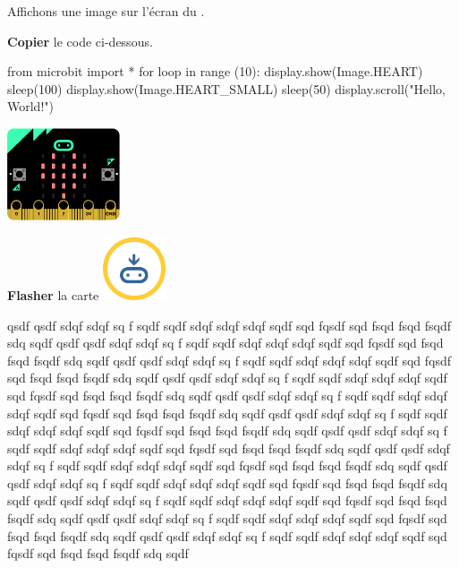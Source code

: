 	


\begin{methode}

	\begin{multicols}{2}

		Affichons une image sur l'écran du \mb.

		\textbf{Copier} le code ci-dessous.

\begin{mucode}
from microbit import *
for loop in range (10):
	display.show(Image.HEART)
	sleep(100)
	display.show(Image.HEART_SMALL)
	sleep(50)
display.scroll("Hello, World!")
\end{mucode}

		\columnbreak
		
		\begin{center}
		\includegraphics[width=9em]{res/mbpy-init-heart.png}
		\end{center}

		\textbf{Flasher} la carte
		\hfill\includegraphics[width=5em,valign=c]{res/flash.png}
		
	\end{multicols}
\end{methode}



qsdf qsdf sdqf sdqf sq f sqdf sqdf sdqf sdqf sdqf sqdf  sqd fqsdf sqd fsqd fsqd fsqdf sdq sqdf
qsdf qsdf sdqf sdqf sq f sqdf sqdf sdqf sdqf sdqf sqdf  sqd fqsdf sqd fsqd fsqd fsqdf sdq sqdf
qsdf qsdf sdqf sdqf sq f sqdf sqdf sdqf sdqf sdqf sqdf  sqd fqsdf sqd fsqd fsqd fsqdf sdq sqdf
qsdf qsdf sdqf sdqf sq f sqdf sqdf sdqf sdqf sdqf sqdf  sqd fqsdf sqd fsqd fsqd fsqdf sdq sqdf
qsdf qsdf sdqf sdqf sq f sqdf sqdf sdqf sdqf sdqf sqdf  sqd fqsdf sqd fsqd fsqd fsqdf sdq sqdf
qsdf qsdf sdqf sdqf sq f sqdf sqdf sdqf sdqf sdqf sqdf  sqd fqsdf sqd fsqd fsqd fsqdf sdq sqdf
qsdf qsdf sdqf sdqf sq f sqdf sqdf sdqf sdqf sdqf sqdf  sqd fqsdf sqd fsqd fsqd fsqdf sdq sqdf
qsdf qsdf sdqf sdqf sq f sqdf sqdf sdqf sdqf sdqf sqdf  sqd fqsdf sqd fsqd fsqd fsqdf sdq sqdf
qsdf qsdf sdqf sdqf sq f sqdf sqdf sdqf sdqf sdqf sqdf  sqd fqsdf sqd fsqd fsqd fsqdf sdq sqdf
qsdf qsdf sdqf sdqf sq f sqdf sqdf sdqf sdqf sdqf sqdf  sqd fqsdf sqd fsqd fsqd fsqdf sdq sqdf
qsdf qsdf sdqf sdqf sq f sqdf sqdf sdqf sdqf sdqf sqdf  sqd fqsdf sqd fsqd fsqd fsqdf sdq sqdf
qsdf qsdf sdqf sdqf sq f sqdf sqdf sdqf sdqf sdqf sqdf  sqd fqsdf sqd fsqd fsqd fsqdf sdq sqdf

